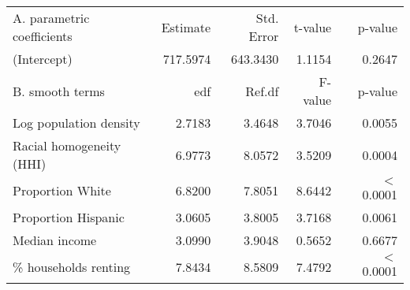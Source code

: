 \begin{table}[ht]
\centering
\begin{tabular}{lrrrr}
   \hline
A. parametric coefficients & Estimate & Std. Error & t-value & p-value \\ 
  (Intercept) & 717.5974 & 643.3430 & 1.1154 & 0.2647 \\ 
   \hline
B. smooth terms & edf & Ref.df & F-value & p-value \\ 
  Log population density & 2.7183 & 3.4648 & 3.7046 & 0.0055 \\ 
  Racial homogeneity (HHI) & 6.9773 & 8.0572 & 3.5209 & 0.0004 \\ 
  Proportion White & 6.8200 & 7.8051 & 8.6442 & $<$ 0.0001 \\ 
  Proportion Hispanic & 3.0605 & 3.8005 & 3.7168 & 0.0061 \\ 
  Median income & 3.0990 & 3.9048 & 0.5652 & 0.6677 \\ 
  \% households renting & 7.8434 & 8.5809 & 7.4792 & $<$ 0.0001 \\ 
   \hline
\end{tabular}
\caption{ } 
\label{Demographic GAM}
\end{table}
